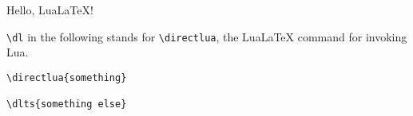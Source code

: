 \documentclass[a4paper,10pt]{report}
\newcommand{\dl}[1]{\directlua{#1}}
\newcommand{\dlts}[1]{\dl{tex.sprint(#1)}}
\begin{document}
Hello, Lua\LaTeX{}!

\lstinline[style=LaTeX]|\dl| in the following stands for 
\lstinline[style=LaTeX]|\directlua|, 
the Lua\LaTeX{} 
command
for invoking Lua.

\begin{lstlisting}[style=LaTeX]
\directlua{something}

\dlts{something else}
\end{lstlisting}
\end{document}
